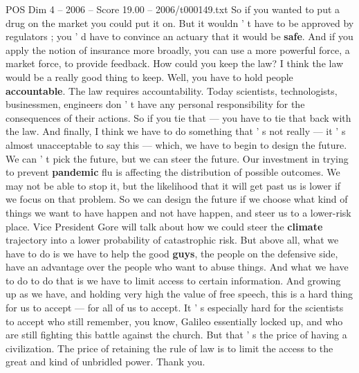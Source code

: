 \begin{textsample}{POS Dim 4 – 2006 – Score 19.00 – 2006/t000149.txt}
So if you wanted to put a drug on the market you could put it on.
But it wouldn ' t have to be approved by regulators ; you ' d have to convince an actuary that it would be \textbf{safe}.
And if you apply the notion of insurance more broadly, you can use a more powerful force, a market force, to provide feedback.
How could you keep the law?
I think the law would be a really good thing to keep.
Well, you have to hold people \textbf{accountable}.
The law requires accountability.
Today scientists, technologists, businessmen, engineers don ' t have any personal responsibility for the consequences of their actions.
So if you tie that — you have to tie that back with the law.
And finally, I think we have to do something that ' s not really — it ' s almost unacceptable to say this — which, we have to begin to design the future.
We can ' t pick the future, but we can steer the future.
Our investment in trying to prevent \textbf{pandemic} flu is affecting the distribution of possible outcomes.
We may not be able to stop it, but the likelihood that it will get past us is lower if we focus on that problem.
So we can design the future if we choose what kind of things we want to have happen and not have happen, and steer us to a lower-risk place.
Vice President Gore will talk about how we could steer the \textbf{climate} trajectory into a lower probability of catastrophic risk.
But above all, what we have to do is we have to help the good \textbf{guys}, the people on the defensive side, have an advantage over the people who want to abuse things.
And what we have to do to do that is we have to limit access to certain information.
And growing up as we have, and holding very high the value of free speech, this is a hard thing for us to accept — for all of us to accept.
It ' s especially hard for the scientists to accept who still remember, you know, Galileo essentially locked up, and who are still fighting this battle against the church.
But that ' s the price of having a civilization.
The price of retaining the rule of law is to limit the access to the great and kind of unbridled power.
Thank you.

\end{textsample}
